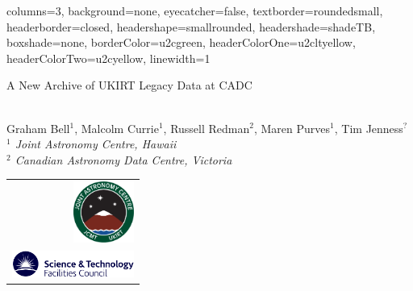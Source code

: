 \documentclass[a0paper,portrait]{baposter}
\begin{document}
\begin{poster}{
    columns=3,
    background=none,
    eyecatcher=false,
    textborder=roundedsmall,
    headerborder=closed,
    headershape=smallrounded,
    headershade=shadeTB,
    boxshade=none,
    borderColor=u2cgreen,
    headerColorOne=u2cltyellow,
    headerColorTwo=u2cyellow,
    linewidth=1
}{

}{\raggedright \smaller
A New Archive of UKIRT Legacy Data at CADC
}{
\vspace{0.1cm} \\
Graham Bell$^1$, Malcolm Currie$^1$, Russell Redman$^2$, Maren Purves$^1$, Tim Jenness$^?$
\vspace{0.1cm} \\
\textsl{$^1$ Joint Astronomy Centre, Hawaii}
\vspace{0.1cm} \\
\textsl{$^2$ Canadian Astronomy Data Centre, Victoria}
}{
\begin{tabular}{r}
\includegraphics[width=2cm]{jaclogo} \\
\includegraphics[width=4cm]{stfclogo}
\end{tabular}
}

\end{poster}
\end{document}
